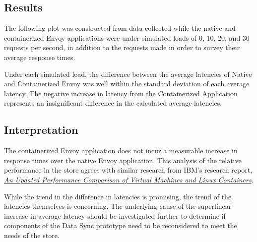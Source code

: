 \documentclass{article}
\begin{document}
\subsection{Results}
The following plot was constructed from data collected while the native and containerized Envoy applications were under simulated loads of 0, 10, 20, and 30 requests per second, in addition to the requests made in order to survey their average response times.


Under each simulated load, the difference between the average latencies of Native and Containerized Envoy was well within the standard deviation of each average latency. The negative increase in latency from the Containerized Application represents an insignificant difference in the calculated average latencies.

\subsection{Interpretation}
The containerized Envoy application does not incur a measurable increase in response times over the native Envoy application. This analysis of the relative performance in the store agrees with similar research from IBM's research report, \href{https://dominoweb.draco.res.ibm.com/reports/rc25482.pdf}{\textit{An Updated Performance Comparison of Virtual Machines and Linux Containers}}.

While the trend in the difference in latencies is promising, the trend of the latencies themselves is concerning. The underlying cause of the superlinear increase in average latency should be investigated further to determine if components of the Data Sync prototype need to be reconsidered to meet the needs of the store.
\end{document}
